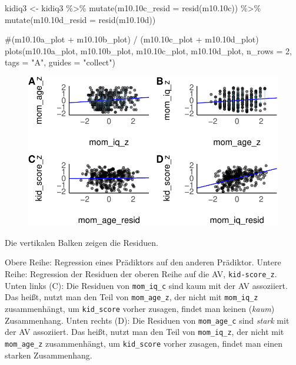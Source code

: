 \documentclass[
  a4paper,
  DIV=11]{scrreprt}
\newenvironment{Shaded}{\begin{snugshade}}{\end{snugshade}}
\newcommand{\AttributeTok}[1]{\textcolor[rgb]{0.40,0.45,0.13}{#1}}
\newcommand{\CommentTok}[1]{\textcolor[rgb]{0.37,0.37,0.37}{#1}}
\newcommand{\DecValTok}[1]{\textcolor[rgb]{0.68,0.00,0.00}{#1}}
\newcommand{\FloatTok}[1]{\textcolor[rgb]{0.68,0.00,0.00}{#1}}
\newcommand{\FunctionTok}[1]{\textcolor[rgb]{0.28,0.35,0.67}{#1}}
\newcommand{\NormalTok}[1]{\textcolor[rgb]{0.00,0.23,0.31}{#1}}
\newcommand{\OtherTok}[1]{\textcolor[rgb]{0.00,0.23,0.31}{#1}}
\newcommand{\SpecialCharTok}[1]{\textcolor[rgb]{0.37,0.37,0.37}{#1}}
\newcommand{\StringTok}[1]{\textcolor[rgb]{0.13,0.47,0.30}{#1}}
\theoremstyle{definition}
\theoremstyle{remark}
\begin{document}
\begin{Shaded}
\begin{Highlighting}[]
\NormalTok{kidiq3 }\OtherTok{\textless{}{-}}
\NormalTok{  kidiq3 }\SpecialCharTok{\%\textgreater{}\%} 
  \FunctionTok{mutate}\NormalTok{(}\AttributeTok{m10.10c\_resid =} \FunctionTok{resid}\NormalTok{(m10}\FloatTok{.10}\NormalTok{c)) }\SpecialCharTok{\%\textgreater{}\%} 
  \FunctionTok{mutate}\NormalTok{(}\AttributeTok{m10.10d\_resid =} \FunctionTok{resid}\NormalTok{(m10}\FloatTok{.10}\NormalTok{d))}
\end{Highlighting}
\end{Shaded}

\begin{Shaded}
\begin{Highlighting}[]
\CommentTok{\#(m10.10a\_plot + m10.10b\_plot) / (m10.10c\_plot + m10.10d\_plot)}
\FunctionTok{plots}\NormalTok{(m10}\FloatTok{.10}\NormalTok{a\_plot, m10}\FloatTok{.10}\NormalTok{b\_plot, m10}\FloatTok{.10}\NormalTok{c\_plot, m10}\FloatTok{.10}\NormalTok{d\_plot, }
      \AttributeTok{n\_rows =} \DecValTok{2}\NormalTok{, }\AttributeTok{tags =} \StringTok{"A"}\NormalTok{,}
      \AttributeTok{guides =} \StringTok{"collect"}\NormalTok{)}
\end{Highlighting}
\end{Shaded}

\begin{figure}[H]

{\centering \includegraphics{./metrische-AV_files/figure-pdf/resid-lm-plot-1.pdf}

}

\end{figure}

Die vertikalen Balken zeigen die Residuen.

Obere Reihe: Regression eines Prädiktors auf den anderen Prädiktor.
Untere Reihe: Regression der Residuen der oberen Reihe auf die AV,
\texttt{kid-score\_z}. Unten links (C): Die Residuen von
\texttt{mom\_iq\_c} sind kaum mit der AV assoziiert. Das heißt, nutzt
man den Teil von \texttt{mom\_age\_z}, der nicht mit \texttt{mom\_iq\_z}
zusammenhängt, um \texttt{kid\_score} vorher zusagen, findet man keinen
(\emph{kaum}) Zusammenhang. Unten rechts (D): Die Residuen von
\texttt{mom\_age\_c} sind \emph{stark} mit der AV assoziiert. Das heißt,
nutzt man den Teil von \texttt{mom\_iq\_z}, der nicht mit
\texttt{mom\_age\_z} zusammenhängt, um \texttt{kid\_score} vorher
zusagen, findet man einen starken Zusammenhang.
\end{document}
